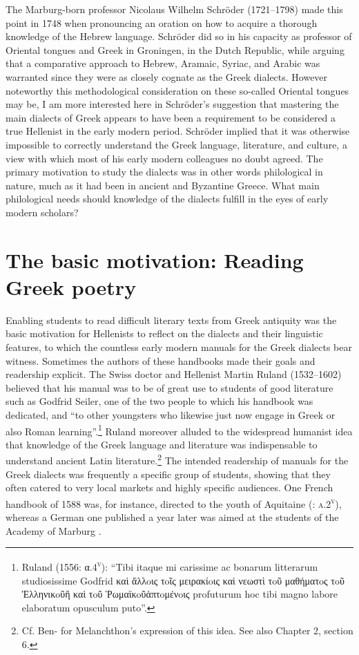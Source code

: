 The Marburg-born professor Nicolaus Wilhelm Schröder (1721–1798) made this point in 1748 when pronouncing an oration on how to acquire a thorough knowledge of the Hebrew language. Schröder did so in his capacity as professor of Oriental tongues and Greek in Groningen, in the Dutch Republic, while arguing that a comparative approach to Hebrew, Aramaic, Syriac, and Arabic was warranted since they were as closely cognate as the Greek dialects. However noteworthy this methodological consideration on these so-called Oriental tongues may be, I am more interested here in Schröder’s suggestion that mastering the main dialects of Greek appears to have been a requirement to be considered a true Hellenist in the early modern period. Schröder implied that it was otherwise impossible to correctly understand the Greek language, literature, and culture, a view with which most of his early modern colleagues no doubt agreed. The primary motivation to study the dialects was in other words philological in nature, much as it had been in ancient and Byzantine Greece. What main philological needs should knowledge of the dialects fulfill in the eyes of early modern scholars?

\section{The basic motivation: Reading Greek poetry}

Enabling students to read difficult literary texts from Greek antiquity was the basic motivation for Hellenists to reflect on the dialects and their linguistic features, to which the countless early modern manuals for the Greek dialects bear witness. Sometimes the authors of these handbooks made their goals and readership explicit. The Swiss doctor and Hellenist Martin Ruland (1532–1602) believed that his manual was to be of great use to students of good literature such as Godfrid Seiler, one of the two people to which his handbook was dedicated, and “to other youngsters who likewise just now engage in Greek or also Roman learning”.\footnote{Ruland (1556: α.4\textsc{\textsuperscript{v}}): “Tibi itaque mi carissime ac bonarum litterarum studiosissime Godfrid καὶ ἄλλoις τoῖς μειρακίoις καὶ νεωστὶ τoῦ μαθήματoς τoῦ Ἑλληνικoῦἢ καὶ τoῦ Ῥωμαϊκoῦἁπτoμένoις profuturum hoc tibi magno labore elaboratum opusculum puto”.} Ruland moreover alluded to the widespread humanist idea that knowledge of the Greek language and literature was indispensable to understand ancient Latin literature.\footnote{Cf. Ben-\citet[139]{Tov2009} for Melanchthon’s expression of this idea. See also Chapter 2, section 6.} The intended readership of manuals for the Greek dialects was frequently a specific group of students, showing that they often catered to very local markets and highly specific audiences. One French handbook of 1588 was, for instance, directed to the youth of Aquitaine (\citealt{Baile1588}: \textsc{a.2}\textsc{\textsuperscript{v}}), whereas a German one published a year later was aimed at the students of the Academy of Marburg \citep{Walper1589}.

